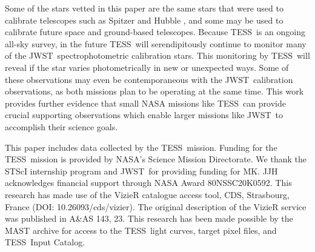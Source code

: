 \documentclass[twocolumn]{aastex631}
\newcommand{\webb}{JWST}
\newcommand{\jwst}{JWST}
\newcommand{\tess}{TESS}
\begin{document}
Some of the stars vetted in this paper are the same stars that were used to calibrate telescopes such as Spitzer \citep{Reach2005} and Hubble \citep{Bohlin2011AJ}, and some may be used to calibrate future space and ground-based telescopes.  Because \tess\ is an ongoing all-sky survey, in the future \tess\ will serendipitously continue to monitor many of the \webb\ spectrophotometric calibration stars. This monitoring by \tess\ will reveal if the star varies photometrically in new or unexpected ways.  Some of these observations may even be contemporaneous with the \webb\ calibration observations, as both missions plan to be operating at the same time.  This work provides further evidence that small NASA missions like \tess\ can provide crucial supporting observations which enable larger missions like \jwst\ to accomplish their science goals.

\begin{acknowledgments}
This paper includes data collected by the \tess\ mission. Funding for the \tess\ mission is provided by NASA's Science Mission Directorate. We thank the STScI internship program and \jwst\ for providing funding for MK. JJH acknowledges financial support through NASA Award 80NSSC20K0592. This research has made use of the VizieR catalogue access tool, CDS, Strasbourg, France (DOI: 10.26093/cds/vizier). The original description of the VizieR service was published in A\&AS 143, 23. This research has been made possible by the MAST archive for access to the \tess\ light curves, target pixel files, and \tess\ Input Catalog.
\end{acknowledgments}

\vspace{5mm}


{}

\end{document}
